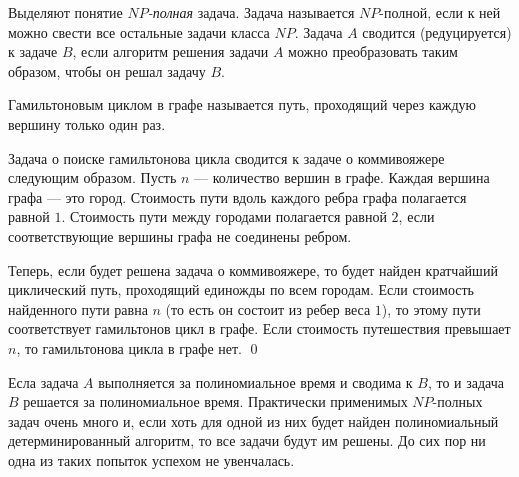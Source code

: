 Выделяют понятие \emph{$NP$-полная} задача. Задача называется $NP$-полной, если к ней можно свести все остальные задачи класса $NP$. Задача $A$ сводится (редуцируется) к задаче $B$, если алгоритм решения задачи $A$ можно преобразовать таким образом, чтобы он решал задачу $B$.

\begin{exampl}
    Гамильтоновым циклом в графе называется путь, проходящий через каждую вершину только один раз.
    
    Задача о поиске гамильтонова цикла сводится к задаче о коммивояжере следующим образом. Пусть $n$ --- количество вершин в графе. Каждая вершина графа --- это город. Стоимость пути вдоль каждого ребра графа полагается равной $1$. Стоимость пути между городами полагается равной $2$, если соответствующие вершины графа не соединены ребром.
    
    Теперь, если будет решена задача о коммивояжере, то будет найден кратчайший циклический путь, проходящий единожды по всем городам. Если стоимость найденного пути равна $n$ (то есть он состоит из ребер веса $1$), то этому пути соответствует гамильтонов цикл в графе. Если стоимость путешествия превышает $n$, то гамильтонова цикла в графе нет.
    \qed
\end{exampl}

Есла задача $A$ выполняется за полиномиальное время и сводима к $B$, то и задача $B$ решается за полиномиальное время. Практически применимых $NP$-полных задач очень много и, если хоть для одной из них будет найден полиномиальный детерминированный алгоритм, то все задачи будут им решены. До сих пор ни одна из таких попыток успехом не увенчалась. 

